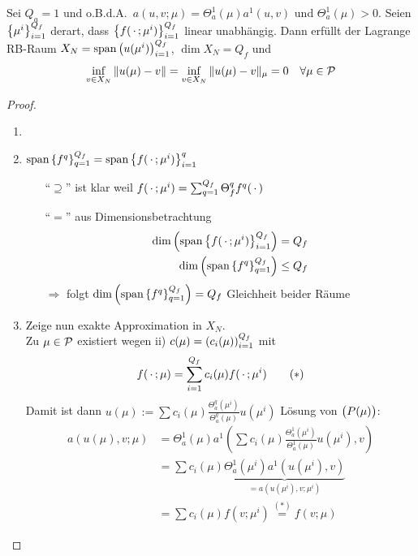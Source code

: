 \begin{satz}
\end{satz}

\begin{satz}
\end{satz}

\begin{satz}
\end{satz}

\begin{satz}
\end{satz}

\begin{satz}[Optimales $X_N$ für $Q_a=1$]
	Sei $Q_a=1$ und o.B.d.A.\ $a(u,v;\mu) = \Theta_a^1(\mu) a^1(u,v)$ und $\Theta_a^1(\mu) > 0$. Seien $\left\{\mu^i\right\}_{i=1}^{Q_f}$ derart, dass $\left\{f(\,\cdot\,;\mu^i)\right\}_{i=1}^{Q_f}$ linear unabhängig. Dann erfüllt der Lagrange RB-Raum $X_N = \operatorname{span}\left(u(\mu^i)\right)_{i=1}^{Q_f}$, $\dim X_N = Q_f$ und
	\[
		\inf_{v \in X_N} \|u(\mu)-v\| = \inf_{v \in X_N} \|u(\mu)-v\|_\mu = 0 \quad \forall \mu \in \mathcal{P}
	\]

	\begin{proof} \beginwithlistbew
		\begin{enumerate}
			\item \checkmark
			\item $\operatorname{span}\left\{f^q\right\}_{q=1}^{Q_f} = \operatorname{span}\left\{f(\,\cdot\,;\mu^i)\right\}_{i=1}^q$
				\begin{itemize}
					\item[``$\supseteq$''] ist klar weil $f(\,\cdot\,;\mu^i) = \sum_{q=1}^{Q_f} \Theta_f^q f^q(\,\cdot\,)$
					\item[``$=$''] aus Dimensionsbetrachtung
						\begin{align*}
							\dim\left( \operatorname{span}\left\{f(\,\cdot\,;\mu^i)\right\}_{i=1}^{Q_f} \right) &= Q_f\\
							\dim\left( \operatorname{span}\left\{f^q\right\}_{q=1}^{Q_f} \right) &\leq Q_f
						\end{align*}
						$\Rightarrow$ folgt $\dim\left( \operatorname{span}\left\{f^q\right\}_{q=1}^{Q_f} \right) = Q_f$ Gleichheit beider Räume
				\end{itemize}
			\item Zeige nun exakte Approximation in $X_N$.\\
				Zu $\mu \in \mathcal{P}$ existiert wegen ii) $c(\mu) = \left(c_i(\mu)\right)_{i=1}^{Q_f}$ mit
				\[
					f(\,\cdot\,;\mu) = \sum_{i=1}^{Q_f} c_i(\mu) f(\,\cdot\,;\mu^i) \tag{$*$}
				\]
				Damit ist dann $u(\mu) := \sum c_i(\mu) \frac{\Theta_a^q(\mu^i)}{\Theta_a^q(\mu)} u(\mu^i)$ Lösung von $\big(P(\mu)\big)$:
				\begin{align*}
					a(u(\mu),v;\mu) &= \Theta_a^1(\mu) a^1(\sum c_i(\mu) \frac{\Theta_a^1(\mu^i)}{\Theta_a^1(\mu)} u(\mu^i), v)\\
					&= \sum c_i(\mu) \underbrace{\Theta_a^1(\mu^i) a^1(u(\mu^i),v)}_{=a(u(\mu^i),v;\mu^i)}\\
					&= \sum c_i(\mu) f(v;\mu^i) \stackrel{(*)}{=} f(v;\mu)
				\end{align*}
		\end{enumerate}
	\end{proof}
\end{satz}

